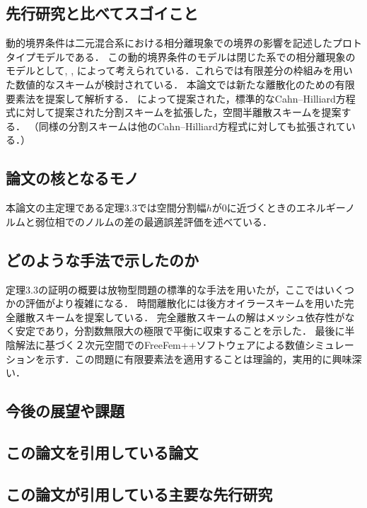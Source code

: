 \documentclass[openary, a4paper, oneside]{jsarticle}
\begin{document}
  \subsection{先行研究と比べてスゴイこと}
  動的境界条件は二元混合系における相分離現象での境界の影響を記述したプロトタイプモデルである．
  この動的境界条件のモデルは閉じた系での相分離現象のモデルとして\cite{FischerMaassDieterich1997}, \cite{FischerMaassDieterich1998}, \cite{KenzlerETAL2001}によって考えられている．これらでは有限差分の枠組みを用いた数値的なスキームが検討されている．
  本論文では新たな離散化のための有限要素法を提案して解析する．
  \cite{ElliottFrenchMilner1989}によって提案された，標準的なCahn--Hilliard方程式に対して提案された分割スキームを拡張した，空間半離散スキームを提案する．
  （同様の分割スキームは他のCahn--Hilliard方程式に対しても拡張されている．）
  \subsection{論文の核となるモノ}
  本論文の主定理である定理3.3では空間分割幅$h$が0に近づくときのエネルギーノルムと弱位相でのノルムの差の最適誤差評価を述べている．
  \subsection{どのような手法で示したのか}
  定理3.3の証明の概要は放物型問題の標準的な手法を用いたが，ここではいくつかの評価がより複雑になる．
  時間離散化には後方オイラースキームを用いた完全離散スキームを提案している．
  完全離散スキームの解はメッシュ依存性がなく安定であり，分割数無限大の極限で平衡に収束することを示した．
  最後に半陰解法に基づく２次元空間でのFreeFem++ソフトウェアによる数値シミュレーションを示す．この問題に有限要素法を適用することは理論的，実用的に興味深い．
  \subsection{今後の展望や課題}
  \subsection{この論文を引用している論文}
  \subsection{この論文が引用している主要な先行研究}

  

\end{document}
